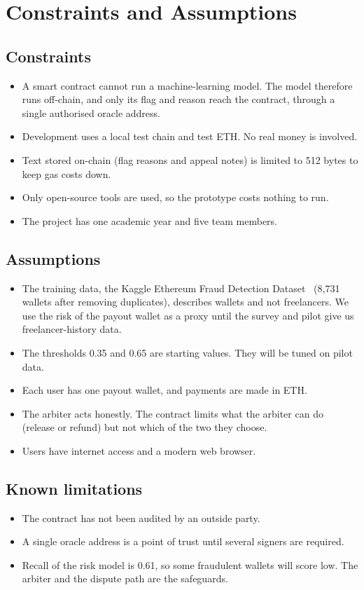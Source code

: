 \chapter{Constraints and Assumptions}
\label{ch:constraints}

\section{Constraints}
\begin{itemize}
\item A smart contract cannot run a machine-learning model. The model therefore runs off-chain, and only its flag and reason reach the contract, through a single authorised oracle address.
\item Development uses a local test chain and test ETH. No real money is involved.
\item Text stored on-chain (flag reasons and appeal notes) is limited to 512 bytes to keep gas costs down.
\item Only open-source tools are used, so the prototype costs nothing to run.
\item The project has one academic year and five team members.
\end{itemize}

\section{Assumptions}
\begin{itemize}
\item The training data, the Kaggle Ethereum Fraud Detection Dataset~\cite{kaggle} (8,731 wallets after removing duplicates), describes wallets and not freelancers. We use the risk of the payout wallet as a proxy until the survey and pilot give us freelancer-history data.
\item The thresholds 0.35 and 0.65 are starting values. They will be tuned on pilot data.
\item Each user has one payout wallet, and payments are made in ETH.
\item The arbiter acts honestly. The contract limits what the arbiter can do (release or refund) but not which of the two they choose.
\item Users have internet access and a modern web browser.
\end{itemize}

\section{Known limitations}
\begin{itemize}
\item The contract has not been audited by an outside party.
\item A single oracle address is a point of trust until several signers are required.
\item Recall of the risk model is 0.61, so some fraudulent wallets will score low. The arbiter and the dispute path are the safeguards.
\end{itemize}
